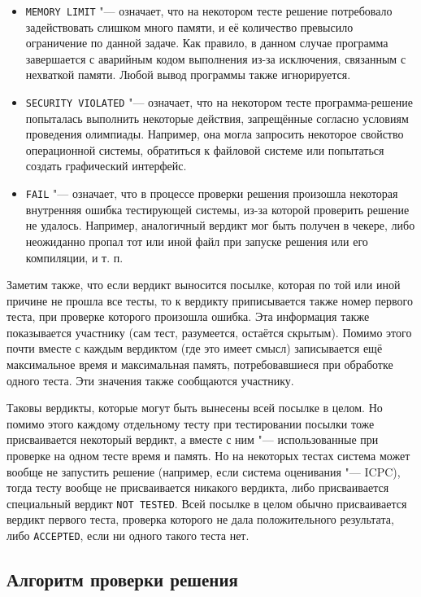 \begin{itemize}
\item \texttt{MEMORY LIMIT} "--- означает, что на некотором тесте решение потребовало задействовать слишком много памяти, и её количество превысило ограничение по данной задаче. Как правило, в данном случае программа завершается с аварийным кодом выполнения из-за исключения, связанным с нехваткой памяти. Любой вывод программы также игнорируется.
\item \texttt{SECURITY VIOLATED} "--- означает, что на некотором тесте программа-решение попыталась выполнить некоторые действия, запрещённые согласно условиям проведения олимпиады. Например, она могла запросить некоторое свойство операционной системы, обратиться к файловой системе или попытаться создать графический интерфейс.
\item \texttt{FAIL} "--- означает, что в процессе проверки решения произошла некоторая внутренняя ошибка тестирующей системы, из-за которой проверить решение не удалось. Например, аналогичный вердикт мог быть получен в чекере, либо неожиданно пропал тот или иной файл при запуске решения или его компиляции, и т. п.
\end{itemize}

Заметим также, что если вердикт выносится посылке, которая по той или иной причине не прошла все тесты, то к вердикту приписывается также номер первого теста, при проверке которого произошла ошибка. Эта информация также показывается участнику (сам тест, разумеется, остаётся скрытым). Помимо этого почти вместе с каждым вердиктом (где это имеет смысл) записывается ещё максимальное время и максимальная память, потребовавшиеся при обработке одного теста. Эти значения также сообщаются участнику.

Таковы вердикты, которые могут быть вынесены всей посылке в целом. Но помимо этого каждому отдельному тесту при тестировании посылки тоже присваивается некоторый вердикт, а вместе с ним "--- использованные при проверке на одном тесте время и память. Но на некоторых тестах система может вообще не запустить решение (например, если система оценивания "--- ICPC), тогда тесту вообще не присваивается никакого вердикта, либо присваивается специальный вердикт \texttt{NOT TESTED}. Всей посылке в целом обычно присваивается вердикт первого теста, проверка которого не дала положительного результата, либо \texttt{ACCEPTED}, если ни одного такого теста нет.

\subsection*{Алгоритм проверки решения}


